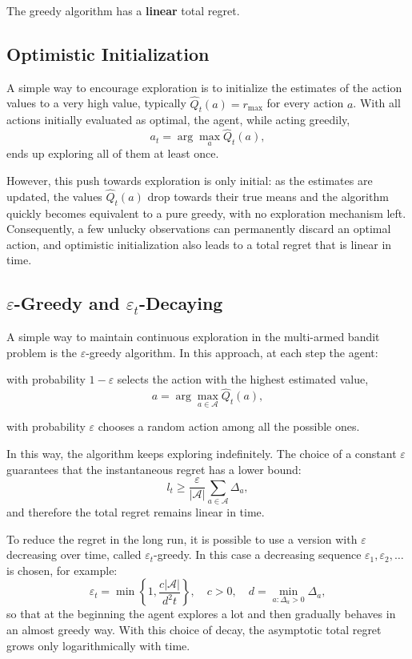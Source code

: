 The greedy algorithm has a \textbf{linear} total regret.

\subsection{Optimistic Initialization}
A simple way to encourage exploration is to initialize the estimates of the action values to a very high value, typically $\hat{Q}_t(a) = r_{\max}$ for every action $a$. With all actions initially evaluated as optimal, the agent, while acting greedily,
\[
a_t = \arg\max_a \hat{Q}_t(a),
\]
ends up exploring all of them at least once.

However, this push towards exploration is only initial: as the estimates are updated, the values $\hat{Q}_t(a)$ drop towards their true means and the algorithm quickly becomes equivalent to a pure greedy, with no exploration mechanism left. Consequently, a few unlucky observations can permanently discard an optimal action, and optimistic initialization also leads to a total regret that is linear in time.

\subsection{$\varepsilon$-Greedy and $\varepsilon_t$-Decaying}

A simple way to maintain continuous exploration in the multi-armed bandit problem is the $\varepsilon$-greedy algorithm. In this approach, at each step the agent:

\begin{compactitemize}
    \item with probability $1-\varepsilon$ selects the action with the highest estimated value,
    \[
    a = \arg\max_{a \in \mathcal{A}} \hat{Q}_t(a),
    \]
    \item with probability $\varepsilon$ chooses a random action among all the possible ones.
\end{compactitemize}

In this way, the algorithm keeps exploring indefinitely. The choice of a constant $\varepsilon$ guarantees that the instantaneous regret has a lower bound:
\[
l_t \ge \frac{\varepsilon}{|\mathcal{A}|} \sum_{a \in \mathcal{A}} \Delta_a,
\]
and therefore the total regret remains linear in time.

To reduce the regret in the long run, it is possible to use a version with $\varepsilon$ decreasing over time, called $\varepsilon_t$-greedy. In this case a decreasing sequence $\varepsilon_1, \varepsilon_2, \dots$ is chosen, for example:
\[
\varepsilon_t = \min \left\{ 1, \frac{c|\mathcal{A}|}{d^2 t} \right\}, \quad c>0, \quad d = \min_{a:\Delta_a>0} \Delta_a,
\]
so that at the beginning the agent explores a lot and then gradually behaves in an almost greedy way. With this choice of decay, the asymptotic total regret grows only logarithmically with time.


